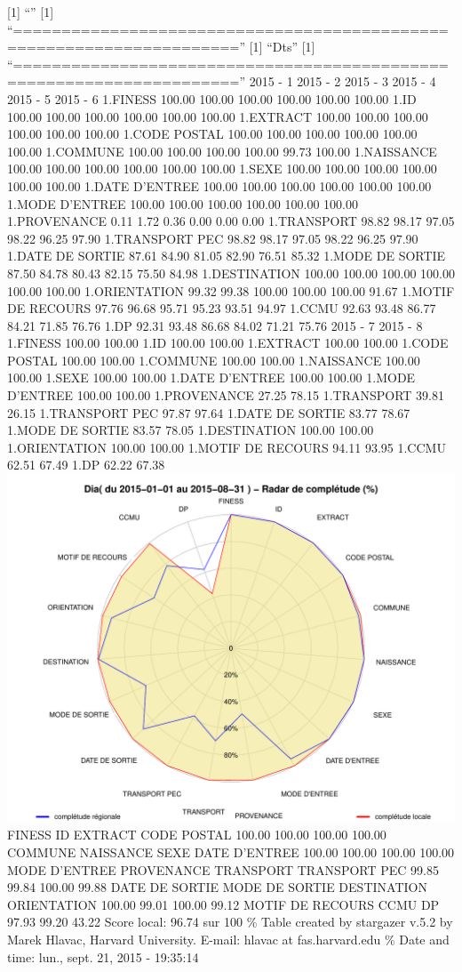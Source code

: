 \documentclass[]{article}
\begin{document}
{[}1{]} ``'' {[}1{]}
``=====================================================================''
{[}1{]} ``Dts'' {[}1{]}
``=====================================================================''
2015 - 1 2015 - 2 2015 - 3 2015 - 4 2015 - 5 2015 - 6 1.FINESS 100.00
100.00 100.00 100.00 100.00 100.00 1.ID 100.00 100.00 100.00 100.00
100.00 100.00 1.EXTRACT 100.00 100.00 100.00 100.00 100.00 100.00 1.CODE
POSTAL 100.00 100.00 100.00 100.00 100.00 100.00 1.COMMUNE 100.00 100.00
100.00 100.00 99.73 100.00 1.NAISSANCE 100.00 100.00 100.00 100.00
100.00 100.00 1.SEXE 100.00 100.00 100.00 100.00 100.00 100.00 1.DATE
D'ENTREE 100.00 100.00 100.00 100.00 100.00 100.00 1.MODE D'ENTREE
100.00 100.00 100.00 100.00 100.00 100.00 1.PROVENANCE 0.11 1.72 0.36
0.00 0.00 0.00 1.TRANSPORT 98.82 98.17 97.05 98.22 96.25 97.90
1.TRANSPORT PEC 98.82 98.17 97.05 98.22 96.25 97.90 1.DATE DE SORTIE
87.61 84.90 81.05 82.90 76.51 85.32 1.MODE DE SORTIE 87.50 84.78 80.43
82.15 75.50 84.98 1.DESTINATION 100.00 100.00 100.00 100.00 100.00
100.00 1.ORIENTATION 99.32 99.38 100.00 100.00 100.00 91.67 1.MOTIF DE
RECOURS 97.76 96.68 95.71 95.23 93.51 94.97 1.CCMU 92.63 93.48 86.77
84.21 71.85 76.76 1.DP 92.31 93.48 86.68 84.02 71.21 75.76 2015 - 7 2015
- 8 1.FINESS 100.00 100.00 1.ID 100.00 100.00 1.EXTRACT 100.00 100.00
1.CODE POSTAL 100.00 100.00 1.COMMUNE 100.00 100.00 1.NAISSANCE 100.00
100.00 1.SEXE 100.00 100.00 1.DATE D'ENTREE 100.00 100.00 1.MODE
D'ENTREE 100.00 100.00 1.PROVENANCE 27.25 78.15 1.TRANSPORT 39.81 26.15
1.TRANSPORT PEC 97.87 97.64 1.DATE DE SORTIE 83.77 78.67 1.MODE DE
SORTIE 83.57 78.05 1.DESTINATION 100.00 100.00 1.ORIENTATION 100.00
100.00 1.MOTIF DE RECOURS 94.11 93.95 1.CCMU 62.51 67.49 1.DP 62.22
67.38 \includegraphics{completude_files/figure-latex/finess-5.pdf}
FINESS ID EXTRACT CODE POSTAL 100.00 100.00 100.00 100.00 COMMUNE
NAISSANCE SEXE DATE D'ENTREE 100.00 100.00 100.00 100.00 MODE D'ENTREE
PROVENANCE TRANSPORT TRANSPORT PEC 99.85 99.84 100.00 99.88 DATE DE
SORTIE MODE DE SORTIE DESTINATION ORIENTATION 100.00 99.01 100.00 99.12
MOTIF DE RECOURS CCMU DP 97.93 99.20 43.22 Score local: 96.74 sur 100 \%
Table created by stargazer v.5.2 by Marek Hlavac, Harvard University.
E-mail: hlavac at fas.harvard.edu \% Date and time: lun., sept. 21, 2015
- 19:35:14
\end{document}
